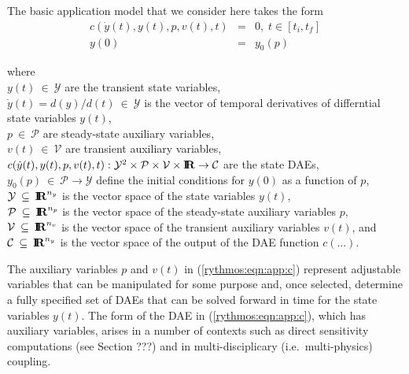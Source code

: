 \documentclass[pdf,ps2pdf,11pt]{SANDreport}
\begin{document}
The basic application model that we consider here takes the form
%
\begin{eqnarray}
c\left( \dot{y}(t), y(t), p, v(t), t \right) & = & 0,
\; t \in \left[ t_i, t_f \right] \label{rythmos:eqn:app:c} \\
y(0) & = & y_0(p) \label{rythmos:eqn:app:c:ic}
\end{eqnarray}
\begin{tabbing}
\hspace{4ex}where\hspace{1ex}\= \\
\>	$y(t) \:\in\:\mathcal{Y}$ are the transient state variables, \\
\>	$\dot{y}(t) = d(y)/d(t)\:\in\:\mathcal{Y}$ is the vector of temporal derivatives of differntial state variables $y(t)$, \\
\>	$p \:\in\:\mathcal{P}$ are steady-state auxiliary variables, \\
\>	$v(t) \:\in\:\mathcal{V}$ are transient auxiliary variables, \\
\>	$c(\dot{y}(t), y(t), p, v(t), t) :
		\mathcal{Y}^2 \times \mathcal{P} \times \mathcal{V} \times \mbox{\textbf{I}}\hspace{-0.6ex}\mbox{\textbf{R}}
		\rightarrow \mathcal{C}$ are the state DAEs, \\
\>	$y_0(p) \:\in\:\mathcal{P} \rightarrow \mathcal{Y}$ define the initial conditions for $y(0)$ as a function of $p$, \\
\>	$\mathcal{Y} \:\subseteq\:\mbox{\textbf{I}}\hspace{-0.6ex}\mbox{\textbf{R}}^{n_y}$ is the vector space of the state variables $y(t)$, \\
\>	$\mathcal{P} \:\subseteq\:\mbox{\textbf{I}}\hspace{-0.6ex}\mbox{\textbf{R}}^{n_p}$ is the vector space of the steady-state auxiliary variables $p$, \\
\>	$\mathcal{V} \:\subseteq\:\mbox{\textbf{I}}\hspace{-0.6ex}\mbox{\textbf{R}}^{n_v}$ is the vector space of the transient auxiliary variables $v(t)$, and \\
\>	$\mathcal{C} \:\subseteq\:\mbox{\textbf{I}}\hspace{-0.6ex}\mbox{\textbf{R}}^{n_y}$ is the vector space of the output of the DAE function $c(\ldots)$.
\end{tabbing}

The auxiliary variables $p$ and $v(t)$ in (\ref{rythmos:eqn:app:c}) represent
adjustable variables that can be manipulated for some purpose and, once
selected, determine a fully specified set of DAEs that can be solved forward
in time for the state variables $y(t)$.  The form of the DAE in
(\ref{rythmos:eqn:app:c}), which has auxiliary variables, arises in a number
of contexts such as direct sensitivity computations (see Section ???) and in
multi-disciplicary (i.e.\ multi-physics) coupling.
\end{document}

